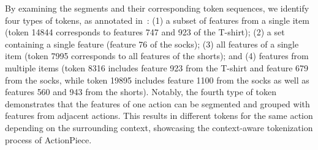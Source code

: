 By examining the segments and their corresponding token sequences, we identify four types of tokens, as annotated in~: (1) a subset of features from a single item (token {\setlength{\fboxsep}{0pt}\colorbox{myblue}{14844}} corresponds to features {\setlength{\fboxsep}{0pt}\colorbox{myblue}{747}} and {\setlength{\fboxsep}{0pt}\colorbox{myblue}{923}} of the T-shirt); (2) a set containing a single feature (feature {\setlength{\fboxsep}{0pt}\colorbox{mygreen}{76}} of the socks); (3) all features of a single item (token {\setlength{\fboxsep}{0pt}\colorbox{myyellow}{7995}} corresponds to all features of the shorts); and (4) features from multiple items (\eg token {\setlength{\fboxsep}{0pt}\colorbox{myblue}{83}\colorbox{mygreen}{16}} includes feature {\setlength{\fboxsep}{0pt}\colorbox{myblue}{923}} from the T-shirt and feature {\setlength{\fboxsep}{0pt}\colorbox{mygreen}{679}} from the socks, while token {\setlength{\fboxsep}{0pt}\colorbox{mygreen}{19}\colorbox{myyellow}{895}} includes feature {\setlength{\fboxsep}{0pt}\colorbox{mygreen}{1100}} from the socks as well as features {\setlength{\fboxsep}{0pt}\colorbox{myyellow}{560}} and {\setlength{\fboxsep}{0pt}\colorbox{myyellow}{943}} from the shorts). Notably, the fourth type of token demonstrates that the features of one action can be segmented and grouped with features from adjacent actions. This results in different tokens for the same action depending on the surrounding context, showcasing the context-aware tokenization process of ActionPiece.

